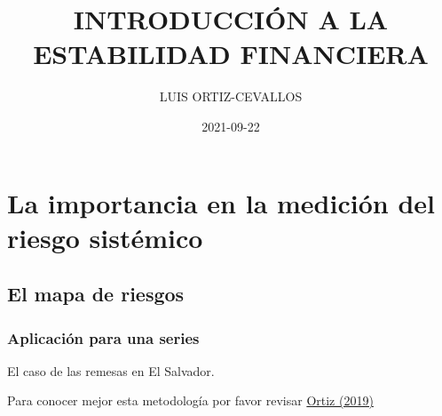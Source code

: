 \documentclass[
]{book}
\title{INTRODUCCIÓN A LA ESTABILIDAD FINANCIERA}
\author{LUIS ORTIZ-CEVALLOS}
\date{2021-09-22}
\begin{document}
\maketitle

{
\setcounter{tocdepth}{1}
\tableofcontents
}
\hypertarget{la-importancia-en-la-mediciuxf3n-del-riesgo-sistuxe9mico}{%
\chapter{La importancia en la medición del riesgo sistémico}\label{la-importancia-en-la-mediciuxf3n-del-riesgo-sistuxe9mico}}

\hypertarget{el-mapa-de-riesgos}{%
\section{El mapa de riesgos}\label{el-mapa-de-riesgos}}

\hypertarget{aplicaciuxf3n-para-una-series}{%
\subsection{Aplicación para una series}\label{aplicaciuxf3n-para-una-series}}

El caso de las remesas en El Salvador.

Para conocer mejor esta metodología por favor revisar
\href{http://www.secmca.org/wp-content/uploads/2019/05/Nota-Econ\%C3\%B3mica-Regional-No.-102.pdf}{Ortiz (2019)}
\end{document}
